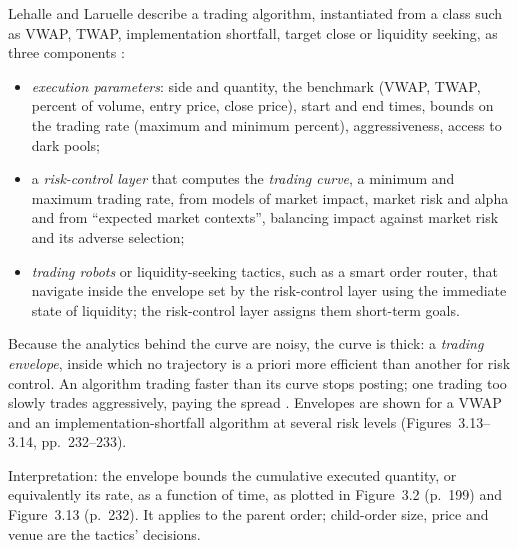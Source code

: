 \begin{qfdefinition}\label{def:trading-envelope}
 Lehalle and Laruelle describe a trading algorithm, instantiated from a class such as VWAP, TWAP, implementation shortfall, target close or liquidity seeking, as three components \citep[sec.~3.1.2, pp.~197--198]{alpha-laruelle}:
\begin{itemize}
\item \emph{execution parameters}: side and quantity, the benchmark (VWAP, TWAP, percent of volume, entry price, close price), start and end times, bounds on the trading rate (maximum and minimum percent), aggressiveness, access to dark pools;
\item a \emph{risk-control layer} that computes the \emph{trading curve}, a minimum and maximum trading rate, from models of market impact, market risk and alpha and from ``expected market contexts'', balancing impact against market risk and its adverse selection;
\item \emph{trading robots} or liquidity-seeking tactics, such as a smart order router, that navigate inside the envelope set by the risk-control layer using the immediate state of liquidity; the risk-control layer assigns them short-term goals.
\end{itemize}
Because the analytics behind the curve are noisy, the curve is thick: a \emph{trading envelope}, inside which no trajectory is a priori more efficient than another for risk control. An algorithm trading faster than its curve stops posting; one trading too slowly trades aggressively, paying the spread \citep[sec.~3.4.1, pp.~231--232]{alpha-laruelle}. Envelopes are shown for a VWAP and an implementation-shortfall algorithm at several risk levels (Figures~3.13--3.14, pp.~232--233).

 Interpretation: the envelope bounds the cumulative executed quantity, or equivalently its rate, as a function of time, as plotted in Figure~3.2 (p.~199) and Figure~3.13 (p.~232). It applies to the parent order; child-order size, price and venue are the tactics' decisions.


\end{qfdefinition}
